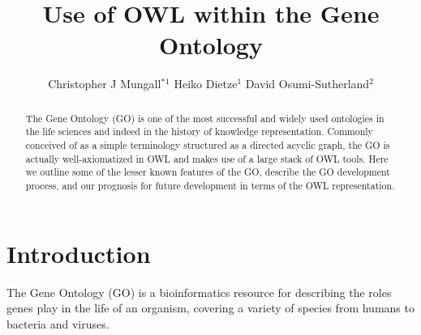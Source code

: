 \documentclass{llncs}
\makeatletter
\def\correspondingauthor{$^*$}
\def\address#1{ \def\@address{\begin{hi}\footnotesize#1\end{hi}}}
\def\iid(#1){\hi$^#1$}
\makeatother
\begin{document}
%
\frontmatter          %

\title{Use of OWL within the Gene Ontology}
\author{
Christopher J Mungall\correspondingauthor$^{1}$
Heiko Dietze$^{1}$
David Osumi-Sutherland$^{2}$
}

\address{%
    \iid(1)Lawrence Berkeley National Laboratory, CA 94720\\
    \iid(2)European Bioinformatics Institute\\
}

\institute{}

\maketitle              %

\begin{abstract}

The Gene Ontology (GO) is one of the most successful and widely used
ontologies in the life sciences and indeed in the history of knowledge
representation. Commonly conceived of as a simple terminology
structured as a directed acyclic graph, the GO is actually
well-axiomatized in OWL and makes use of a large stack of OWL
tools. Here we outline some of the lesser known features of the GO,
describe the GO development process, and our prognosis for future
development in terms of the OWL representation.


\end{abstract}

\section{Introduction}


The Gene Ontology (GO) is a bioinformatics resource for describing the
roles genes play in the life of an organism, covering a variety of
species from humans to bacteria and viruses.
\end{document}

